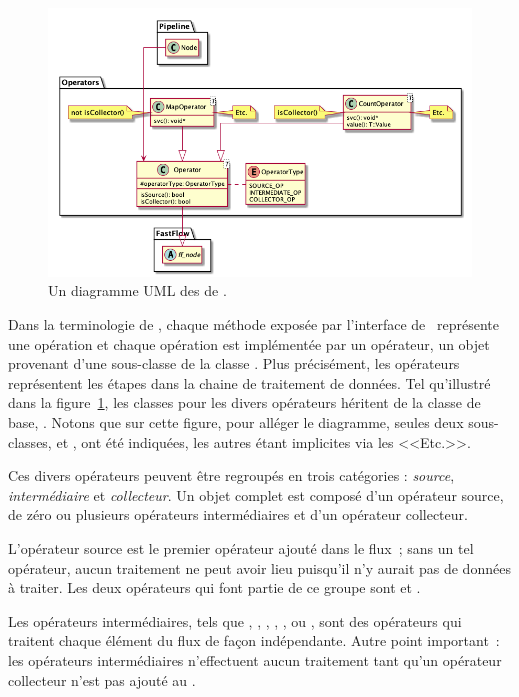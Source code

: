\begin{figure}
\centering
         \includegraphics[width=1.0\textwidth]{Figures/operators-details.png}
      \caption{Un diagramme UML des  de \ppff.}
       \label{operators.fig}
\end{figure}


Dans la terminologie de , chaque m\'ethode expos\'ee par l'interface de \ppff\ repr\'esente une op\'eration et chaque op\'eration est impl\'ement\'ee par un op\'erateur, un objet provenant d'une sous-classe de la classe . Plus pr\'ecisément, les op\'erateurs repr\'esentent les \'etapes dans la chaine de traitement de donn\'ees. Tel qu'illustré dans la figure~\ref{operators.fig}, les classes pour les divers op\'erateurs h\'eritent de la classe de base, . 
%
Notons que sur cette figure, pour alléger le diagramme, seules deux sous-classes,  et , ont été indiqu\'ees, les autres \'etant implicites via les <<Etc.>>.
%

Ces divers opérateurs peuvent \^etre regroupés en trois cat\'egories : \emph{source}, \emph{interm\'ediaire} et \emph{collecteur}.
%
Un objet  complet est compos\'e d'un op\'erateur source, de z\'ero ou plusieurs op\'erateurs interm\'ediaires et d'un op\'erateur collecteur. 

L'op\'erateur source est le premier op\'erateur ajout\'e dans le flux~; sans un tel op\'erateur, aucun traitement ne peut avoir lieu puisqu'il n'y aurait pas de données à traiter. Les deux op\'erateurs qui font partie de ce groupe sont  et .

Les op\'erateurs interm\'ediaires, tels que , , , , ,  ou , sont des op\'erateurs qui traitent chaque \'el\'ement du flux de fa\c{c}on ind\'ependante. Autre point important~: les op\'erateurs interm\'ediaires n'effectuent aucun traitement tant qu'un op\'erateur collecteur n'est pas ajout\'e au . 

